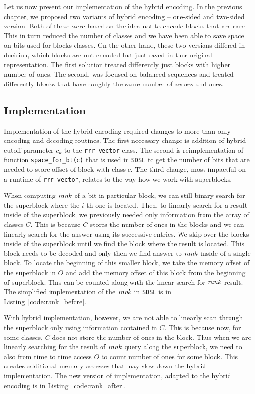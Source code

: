 Let us now present our implementation of the hybrid encoding. In the previous chapter, we
proposed two variants of hybrid encoding -- one-sided and two-sided version. Both of these
were based on the idea not to encode blocks that are rare. This in turn reduced the number
of classes and we  have been able to save space on bits used for blocks classes. On the other
hand, these two versions differed in decision, which blocks are not encoded but just saved in
ther original representation. The first solution treated differently just blocks with higher
number of ones. The second, was focused on balanced sequences and treated differently blocks
that have roughly the same number of zeroes and ones.

\subsection{Implementation}

Implementation of the hybrid encoding required changes to more than only encoding and decoding
routines. The first necessary change is addition of hybrid cutoff parameter $c_k$
to the \verb'rrr_vector' class. The second is reimplementation of function
\texttt{space\_for\_bt(c)} that is used in \texttt{SDSL} to get the number of bits that are
needed to store offset of block with class $c$. The third change, most impactful on a runtime
of \verb'rrr_vector', relates to the way how we work with superblocks.

When computing $\mathit{rank}$ of a bit in particular block, we can still binary search for
the superblock where the $i$-th one is located. Then, to linearly search for a result
inside of the superblock, we previously needed only information from the array of classes $C$.
This is because $C$ stores the number of ones in the blocks and we can linearly
search for the answer using its successive entries. We skip over the blocks inside of the
superblock until we find the block where the result is located. This block needs to be decoded
and only then we find answer to $\mathit{rank}$ inside of a single block. To locate the beginning of this
smaller block, we take the memory offset of the superblock in $O$ and add the memory offset of this
block from the beginning of superblock. This can be counted along with the linear search for $\mathit{rank}$
result. The simplified implementation of the $\mathit{rank}$ in \texttt{SDSL} is in Listing~\ref{code:rank_before}.

With hybrid implementation, however, we are not able to linearly scan through the superblock only
using information contained in $C$. This is because now, for some classes, $C$ does not
store the number of ones in the block. Thus when we are linearly searching for the result
of $\mathit{rank}$ query along the superblock, we need to also from time to time access $O$ to count
number of ones for some block. This creates additional memory accesses that may slow down the
hybrid implementation. The new version of implementation, adapted to the hybrid encoding is in
Listing~\ref{code:rank_after}.

